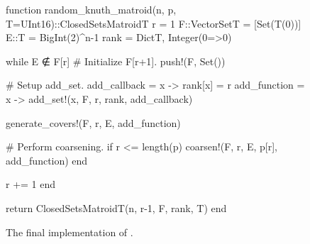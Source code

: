 \begin{figure}
  \begin{jllisting}
function random_knuth_matroid(n, p, T=UInt16)::ClosedSetsMatroid{T}
  r = 1
  F::Vector{Set{T}} = [Set(T(0))]
  E::T = BigInt(2)^n-1
  rank = Dict{T, Integer}(0=>0)

  while E ∉ F[r]
    # Initialize F[r+1].
    push!(F, Set())

    # Setup add_set.
    add_callback = x -> rank[x] = r
    add_function = x -> add_set!(x, F, r, rank, add_callback)

    generate_covers!(F, r, E, add_function)

    # Perform coarsening.
    if r <= length(p) coarsen!(F, r, E, p[r], add_function) end

    r += 1
  end

  return ClosedSetsMatroid{T}(n, r-1, F, rank, T)
end
  \end{jllisting}
  \caption{The final implementation of .}
  \label{code:random_knuth_matroid}
\end{figure}